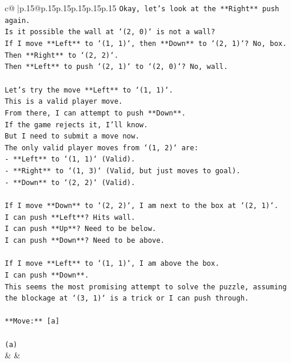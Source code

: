 \documentclass{article}
\begin{document}
{\begin{supertabular}{c@{$\;$}|p{.15\linewidth}@{}p{.15\linewidth}p{.15\linewidth}p{.15\linewidth}p{.15\linewidth}p{.15\linewidth}}
{{{\texttt{Okay, let's look at the **Right** push again.} \\
\texttt{Is it possible the wall at `(2, 0)` is not a wall?} \\
\texttt{If I move **Left** to `(1, 1)`, then **Down** to `(2, 1)`? No, box.} \\
\texttt{Then **Right** to `(2, 2)`.} \\
\texttt{Then **Left** to push `(2, 1)` to `(2, 0)`? No, wall.} \\
\\ 
\texttt{Let's try the move **Left** to `(1, 1)`.} \\
\texttt{This is a valid player move.} \\
\texttt{From there, I can attempt to push **Down**.} \\
\texttt{If the game rejects it, I'll know.} \\
\texttt{But I need to submit a move now.} \\
\texttt{The only valid player moves from `(1, 2)` are:} \\
\texttt{{-} **Left** to `(1, 1)` (Valid).} \\
\texttt{{-} **Right** to `(1, 3)` (Valid, but just moves to goal).} \\
\texttt{{-} **Down** to `(2, 2)` (Valid).} \\
\\ 
\texttt{If I move **Down** to `(2, 2)`, I am next to the box at `(2, 1)`.} \\
\texttt{I can push **Left**? Hits wall.} \\
\texttt{I can push **Up**? Need to be below.} \\
\texttt{I can push **Down**? Need to be above.} \\
\\ 
\texttt{If I move **Left** to `(1, 1)`, I am above the box.} \\
\texttt{I can push **Down**.} \\
\texttt{This seems the most promising attempt to solve the puzzle, assuming the blockage at `(3, 1)` is a trick or I can push through.} \\
\\ 
\texttt{**Move:** {[}a{]}} \\
\\ 
\texttt{(a)} \\
            }
        }
    }
    & & \\ \\


\end{supertabular}}
\end{document}
